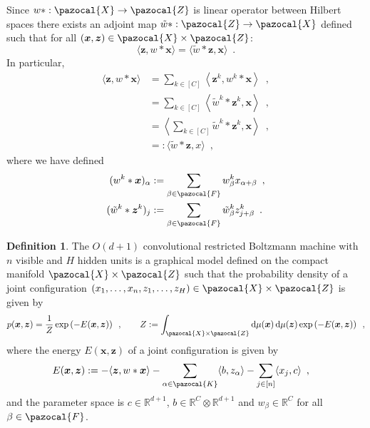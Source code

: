 \documentclass[12pt]{article}
\theoremstyle{definition}%
\theoremstyle{definition}
\newtheorem{defn}{Definition}[section]
\theoremstyle{remark}
\begin{document}
Since $w \ast : \pazocal{X} \to \pazocal{Z}$ is linear operator between Hilbert spaces there exists an adjoint map $\tilde{w}\ast : \pazocal{Z} \to \pazocal{X}$ defined such that for all $(\bm{x},\bm{z}) \in \pazocal{X} \times \pazocal{Z}$:
\begin{equation}
	\langle \bm{z}, w \ast \bm{x} \rangle = \langle \tilde{w}\ast \bm{z}, \bm{x} \rangle \enspace .
\end{equation}
In particular,
\begin{align}
	\langle \bm{z}, w \ast \bm{x} \rangle
		& = \sum_{k \in [C]} \left\langle \bm{z}^k, w^k \ast \bm{x} \right\rangle \enspace , \\
		& = \sum_{k \in [C]} \left\langle \tilde{w}^k \ast \bm{z}^k, \bm{x} \right\rangle \enspace , \\
		& = \left\langle \sum_{k \in [C]} \tilde{w}^k \ast \bm{z}^k, \bm{x} \right\rangle \enspace , \\
		& =: \langle \tilde{w}\ast \bm{z}, x \rangle \enspace ,
\end{align}
where we have defined
\begin{align}
	(w^k \ast \bm{x})_\alpha
		& := \sum_{\beta \in \pazocal{F}} w_\beta^k x_{\alpha + \beta} \enspace , \\
	(\tilde{w}^k \ast \bm{z}^k)_j
		& := \sum_{\beta \in \pazocal{F}} \tilde{w}_\beta^k z^k_{j + \beta} \enspace .
\end{align}

\begin{defn}
The $O(d+1)$ convolutional restricted Boltzmann machine with $n$ visible and $H$ hidden units is a graphical model defined on the compact manifold $\pazocal{X}\times\pazocal{Z}$ such that the probability density of a joint configuration $(x_1,\ldots, x_{n},z_1,\ldots,z_H) \in \pazocal{X}\times \pazocal{Z}$ is given by
\begin{equation}
	p(\bm{x},\bm{z}) = \frac{1}{Z} \exp \left(-E(\bm{x},\bm{z})\right) \enspace , \quad \quad Z := \int_{\pazocal{X}\times \pazocal{Z}} {\rm d}\mu(\bm{x}) \, {\rm d}\mu(\bm{z}) \exp\left(-E(\bm{x},\bm{z})\right) \enspace ,
\end{equation}
where the energy $E(\bm{x},\bm{z})$ of a joint configuration is given by
\begin{align}
	E(\bm{x},\bm{z})
		& := -\langle \bm{z}, w\ast \bm{x} \rangle - \sum_{\alpha \in \pazocal{K}} \langle b, z_\alpha \rangle - \sum_{j\in[n]}\langle x_j, c \rangle \enspace ,
\end{align}
and the parameter space is $c \in \mathbb{R}^{d+1}$, $b \in \mathbb{R}^C \otimes \mathbb{R}^{d+1}$ and $w_\beta \in \mathbb{R}^C$ for all $\beta \in \pazocal{F}$.
\end{defn}
\end{document}
